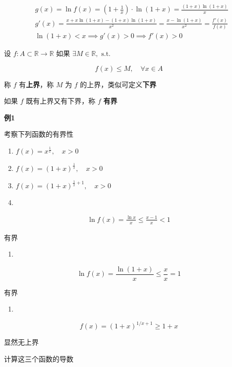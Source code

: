 \[
\begin{aligned}
&g(x) = \ln f(x) =\left(1+\frac{1}{x} \right) \cdot \ln (1+x) = \frac{(1+x)\ln(1+x) }{x}\\
&g'(x) = \frac{x+x\ln(1+x)-(1+x)\ln(1+x)}{x^{2}}=\frac{x-\ln(1+x)}{x^{2}}=\frac{f'(x)}{f(x)}\\
&\ln(1+x)<x\implies g'(x)>0\implies f'(x)>0
\end{aligned}
\]

设 \(f:A\subset \mathbb{R }\to \mathbb{R}\) 如果
\(\exists M \in \mathbb{R},\text{ s.t. }\)

\[
f(x)\leq M, \quad \forall x \in A
\]

称 \(f\) 有\textbf{上界}，称 \(M\) 为 \(f\)
的上界，类似可定义\textbf{下界}

如果 \(f\) 既有上界又有下界，称 \(f\) \textbf{有界}

\textbf{例1}

考察下列函数的有界性

\begin{enumerate}
\def\labelenumi{\arabic{enumi}.}
\item
  \(f(x)=x^{\frac{1}{x}}, \quad x>0\)
\item
  \(f(x)=(1+x)^{\frac{1}{x}}, \quad x>0\)
\item
  \(f(x)=(1+x)^{\frac{1}{x}+1}, \quad x>0\)
\item
\end{enumerate}

\[
\begin{aligned}
\ln f(x)=\frac{\ln x}{x}\leq \frac{x-1}{x} < 1
\end{aligned}
\]

有界

\begin{enumerate}
\def\labelenumi{\arabic{enumi}.}
\setcounter{enumi}{1}
\tightlist
\item
\end{enumerate}

\[
\ln f(x)= \frac{\ln(1+x)}{x} \leq \frac{x}{x} =1
\]

有界

\begin{enumerate}
\def\labelenumi{\arabic{enumi}.}
\setcounter{enumi}{2}
\tightlist
\item
\end{enumerate}

\[
f(x)=(1+x)^{1/x+1}\geq 1+x
\]

显然无上界

计算这三个函数的导数

